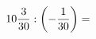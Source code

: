 \documentclass[preview]{standalone}
\begin{document}
\begin{align*}
10 { 3 \over 30 }  :  \left( - { 1 \over 30 } \right)  =
\end{align*}
\end{document}

